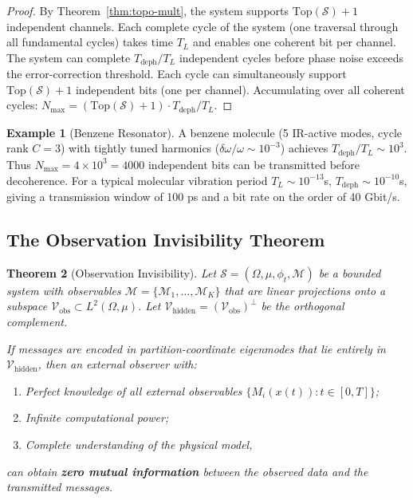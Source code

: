 \documentclass[11pt,twocolumn,a4paper]{article}
\newtheorem{theorem}{Theorem}[section]
\theoremstyle{definition}
\newtheorem{example}[theorem]{Example}
\newcommand{\calM}{\mathcal{M}}
\begin{document}
\begin{proof}
By Theorem~\ref{thm:topo-mult}, the system supports $\text{Top}(\mathcal{S}) + 1$ independent channels. Each complete cycle of the system (one traversal through all fundamental cycles) takes time $T_L$ and enables one coherent bit per channel. The system can complete $T_{\text{deph}}/T_L$ independent cycles before phase noise exceeds the error-correction threshold. Each cycle can simultaneously support $\text{Top}(\mathcal{S}) + 1$ independent bits (one per channel). Accumulating over all coherent cycles: $N_{\max} = (\text{Top}(\mathcal{S}) + 1) \cdot T_{\text{deph}}/T_L$.
\end{proof}

\begin{example}[Benzene Resonator]
A benzene molecule (5 IR-active modes, cycle rank $C=3$) with tightly tuned harmonics ($\delta\omega/\omega \sim 10^{-3}$) achieves $T_{\text{deph}}/T_L \sim 10^3$. Thus $N_{\max} = 4 \times 10^3 = 4000$ independent bits can be transmitted before decoherence. For a typical molecular vibration period $T_L \sim 10^{-13}$s, $T_{\text{deph}} \sim 10^{-10}$s, giving a transmission window of 100 ps and a bit rate on the order of 40 Gbit/s.
\end{example}

\subsection{The Observation Invisibility Theorem}

\begin{theorem}[Observation Invisibility]
\label{thm:invisibility}
Let $\mathcal{S} = (\Omega, \mu, \phi_t, \calM)$ be a bounded system with observables $\calM = \{\calM_1, \ldots, \calM_K\}$ that are linear projections onto a subspace $\mathcal{V}_{\text{obs}} \subset L^2(\Omega,\mu)$. Let $\mathcal{V}_{\text{hidden}} = (\mathcal{V}_{\text{obs}})^\perp$ be the orthogonal complement.

If messages are encoded in partition-coordinate eigenmodes that lie entirely in $\mathcal{V}_{\text{hidden}}$, then an external observer with:
\begin{enumerate}[nosep,label=(\roman*)]
\item Perfect knowledge of all external observables $\{M_i(x(t)) : t \in [0,T]\}$;
\item Infinite computational power;
\item Complete understanding of the physical model,
\end{enumerate}
\noindent can obtain \textbf{zero mutual information} between the observed data and the transmitted messages.
\end{theorem}
\end{document}
